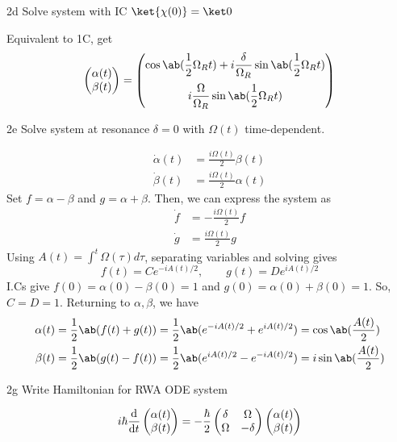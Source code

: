 \documentclass[12pt]{article}
\begin{document}
\begin{exc}{2d}
Solve system with IC $\ket{\chi(0)} = \ket 0$
\end{exc}
\begin{ans}
Equivalent to 1C, get 
\[\begin{pmatrix}
    \alpha(t) \\ 
    \beta(t) 
\end{pmatrix} = 
\begin{pmatrix}
    \displaystyle \cos\ab(\frac12 \Omega_R t) + i \frac{\delta }{\Omega_R} \sin\ab(\frac12 \Omega_R t) \\[1em] 
    \displaystyle i \frac{\Omega}{\Omega_R}\sin\ab(\frac12 \Omega_R t)
\end{pmatrix}
\]
\end{ans}
\begin{exc}{2e}
    Solve system at resonance $\delta = 0$ with $\Omega(t)$ time-dependent. 
\end{exc}
\begin{ans}
\begin{align*}
    \dot \alpha(t) &= \frac{i\Omega(t)}{2}\beta(t) \\ 
    \dot \beta(t) &= \frac{i\Omega(t)}{2}\alpha(t)
\end{align*}
Set $f = \alpha - \beta$ and $g = \alpha + \beta$. Then, we can express the system as 
\begin{align*}
    \dot f &= -\frac{i\Omega(t)}{2}f \\ 
    \dot g &= \frac{i\Omega(t)}{2}g
\end{align*}
Using $A(t) = \int^t \Omega(\tau)d\tau$, separating variables and solving gives 
\[f(t) = Ce^{-iA(t)/2}, \qquad g(t) = De^{iA(t)/2}\]
I.Cs give $f(0) = \alpha(0) - \beta(0) = 1$ and $g(0) = \alpha(0) + \beta(0) = 1$. So, $C = D = 1$. Returning to $\alpha, \beta$, we have 
\begin{align*}
    \alpha(t) &= \frac{1}{2}\ab(f(t) + g(t)) = \frac{1}{2}\ab(e^{-iA(t)/2} + e^{iA(t)/2}) = \cos\ab(\frac{A(t)}{2})\\
    \beta(t) &= \frac{1}{2}\ab(g(t) - f(t)) = \frac{1}{2}\ab(e^{iA(t)/2} - e^{-iA(t)/2}) = i\sin\ab(\frac{A(t)}{2})
\end{align*}
\end{ans}


\begin{exc}{2g}
    Write Hamiltonian for RWA ODE system 
\end{exc}
\begin{ans}
    \[i\hbar \odv{}{t}\begin{pmatrix}
        \alpha(t) \\ \beta(t)
    \end{pmatrix}
    = -\frac{\hbar}{2}\begin{pmatrix}
        \delta & \Omega \\ 
        \Omega & -\delta
    \end{pmatrix}
    \begin{pmatrix}
        \alpha(t) \\ \beta(t)
    \end{pmatrix}
    \]
\end{ans}
\end{document}
